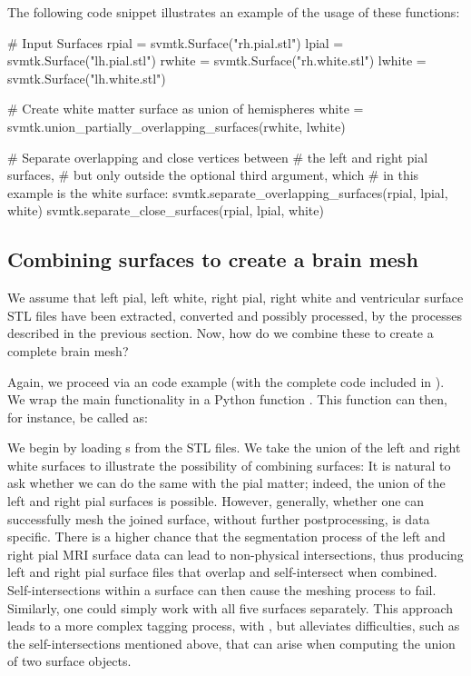 The following code snippet illustrates an example of the usage of these functions:
\begin{python}
# Input Surfaces
rpial = svmtk.Surface("rh.pial.stl")
lpial = svmtk.Surface("lh.pial.stl")
rwhite = svmtk.Surface("rh.white.stl")
lwhite = svmtk.Surface("lh.white.stl")

# Create white matter surface as union of hemispheres
white = svmtk.union_partially_overlapping_surfaces(rwhite,
                                                   lwhite)

# Separate overlapping and close vertices between
# the left and right pial surfaces,
# but only outside the optional third argument, which
# in this example is the white surface:
svmtk.separate_overlapping_surfaces(rpial, lpial, white)
svmtk.separate_close_surfaces(rpial, lpial, white) 
\end{python} 

\subsection{Combining surfaces to create a brain mesh}
We assume that left pial, left white, right pial, right white and
ventricular surface STL files have been extracted, converted and
possibly processed, by the processes described in the previous
section. Now, how do we combine these to create a complete brain mesh?

Again, we proceed via an \svmtk{} code example (with the complete
code included in ). We wrap
the main functionality in a Python function
. This function can then, for
instance, be called as:

We begin by loading s from the STL files. 
We take the union of the left and right white surfaces to illustrate
the possibility of combining surfaces:
It is natural to ask whether we can do the same with the pial matter;
indeed, the union of the left and right pial surfaces is
possible. However, generally, whether one can successfully mesh the
joined surface, without further postprocessing, is data specific.
There is a higher chance that the {\freesurfer} segmentation process
of the left and right pial MRI surface data can lead to non-physical
intersections, thus producing left and right pial surface files that
overlap and self-intersect when combined.  Self-intersections within
a surface can then cause the meshing process to fail. Similarly, one
could simply work with all five surfaces separately.  This approach 
leads to a more complex tagging process, with , but
alleviates difficulties, such as the self-intersections mentioned above, 
that can arise when computing the union of two surface objects.

